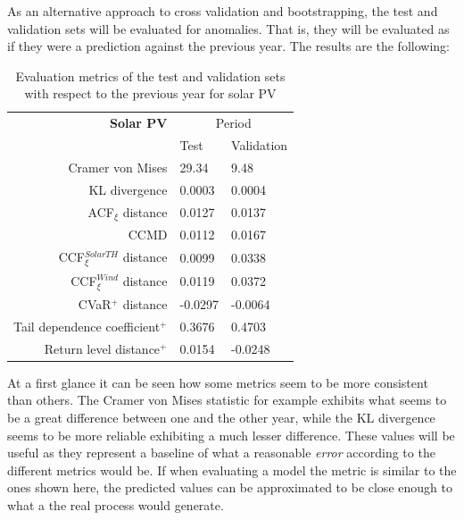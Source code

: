As an alternative approach to cross validation and bootstrapping, the test and validation sets will be evaluated for anomalies. That is, they will be evaluated as if they were a prediction against the previous year. The results are the following:

\begin{table}[ht]
    \centering
    \begin{tabular}{rll}
        \toprule
        \textbf{Solar PV} & \multicolumn{2}{c}{Period} \\ 
        \cmidrule(lr){2-3}
            & Test & Validation \\
        \midrule
        Cramer von Mises & 29.34 & 9.48 \\
        KL divergence & 0.0003 & 0.0004 \\
        ACF$_\xi$ distance & 0.0127 & 0.0137 \\
        \midrule
        CCMD & 0.0112 & 0.0167 \\
        CCF$_\xi^{Solar TH}$ distance & 0.0099 & 0.0338\\
        CCF$_\xi^{Wind}$ distance & 0.0119 & 0.0372 \\
        \midrule
        CVaR$^+$ distance & -0.0297 & -0.0064 \\
        Tail dependence coefficient$^+$ & 0.3676 & 0.4703 \\
        Return level distance$^+$ & 0.0154 & -0.0248 \\
        \bottomrule
    \end{tabular}
    \caption{Evaluation metrics of the test and validation sets with respect to the previous year for solar PV}
    \label{table:eval-metrics-test-validation-solar-pv}
\end{table}

At a first glance it can be seen how some metrics seem to be more consistent than others. The Cramer von Mises statistic for example exhibits what seems to be a great difference between one and the other year, while the KL divergence seems to be more reliable exhibiting a much lesser difference. These values will be useful as they represent a baseline of what a reasonable \textit{error} according to the different metrics would be. If when evaluating a model the metric is similar to the ones shown here, the predicted values can be approximated to be close enough to what a the real process would generate. 

